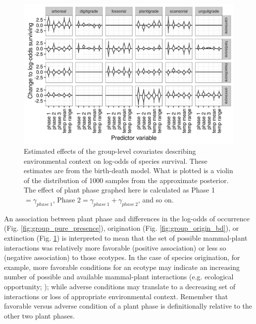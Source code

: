 \documentclass[12pt,letterpaper]{article}
\begin{document}
\begin{figure}[ht]
  \centering
  \includegraphics[width=\textwidth,height=0.4\textheight,keepaspectratio=true]{figure/group_on_survival_bd}
  \caption[Effects of group-level covariates on log-odds of ecotype survival as estimated from the birth-death model]{Estimated effects of the group-level covariates describing environmental context on log-odds of species survival. These estimates are from the birth-death model. What is plotted is a violin of the distribution of 1000 samples from the approximate posterior. The effect of plant phase graphed here is calculated as Phase 1\( = \gamma_{phase\ 1}\), Phase 2\( = \gamma_{phase\ 1} + \gamma_{phase\ 2}\), and so on.} 
  \label{fig:group_surv_bd}
\end{figure}



An association between plant phase and differences in the log-odds of occurrence (Fig. \ref{fig:group_pure_presence}), origination (Fig. \ref{fig:group_origin_bd}), or extinction (Fig. \ref{fig:group_surv_bd}) is interpreted to mean that the set of possible mammal-plant interactions was relatively more favorable (positive association) or less so (negative association) to those ecotypes. In the case of species origination, for example, more favorable conditions for an ecotype may indicate an increasing number of possible and available mammal-plant interactions (e.g. ecological opportunity; \citealp{Yoder2010,Losos2010,Losos2010a}); while adverse conditions may translate to a decreasing set of interactions or loss of appropriate environmental context. Remember that favorable versus adverse condition of a plant phase is definitionally relative to the other two plant phases. 
\end{document}
